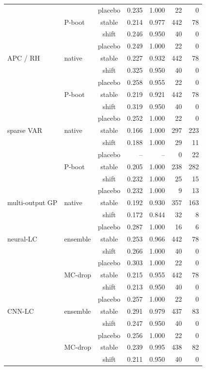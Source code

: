 {\begin{longtable}{@{}llcrrrr@{}}
 &  & placebo & 0.235 & 1.000 & 22 & 0 \\
 & P-boot & stable & 0.214 & 0.977 & 442 & 78 \\
 &  & shift & 0.246 & 0.950 & 40 & 0 \\
 &  & placebo & 0.249 & 1.000 & 22 & 0 \\
\addlinespace[2pt]
APC / RH & native & stable & 0.227 & 0.932 & 442 & 78 \\
 &  & shift & 0.325 & 0.950 & 40 & 0 \\
 &  & placebo & 0.258 & 0.955 & 22 & 0 \\
 & P-boot & stable & 0.219 & 0.921 & 442 & 78 \\
 &  & shift & 0.319 & 0.950 & 40 & 0 \\
 &  & placebo & 0.252 & 1.000 & 22 & 0 \\
\addlinespace[2pt]
sparse VAR & native & stable & 0.166 & 1.000 & 297 & 223 \\
 &  & shift & 0.188 & 1.000 & 29 & 11 \\
 &  & placebo & -- & -- & 0 & 22 \\
 & P-boot & stable & 0.205 & 1.000 & 238 & 282 \\
 &  & shift & 0.232 & 1.000 & 25 & 15 \\
 &  & placebo & 0.232 & 1.000 & 9 & 13 \\
\addlinespace[2pt]
multi-output GP & native & stable & 0.192 & 0.930 & 357 & 163 \\
 &  & shift & 0.172 & 0.844 & 32 & 8 \\
 &  & placebo & 0.287 & 1.000 & 16 & 6 \\
\addlinespace[2pt]
neural-LC & ensemble & stable & 0.253 & 0.966 & 442 & 78 \\
 &  & shift & 0.266 & 1.000 & 40 & 0 \\
 &  & placebo & 0.303 & 1.000 & 22 & 0 \\
 & MC-drop & stable & 0.215 & 0.955 & 442 & 78 \\
 &  & shift & 0.213 & 0.950 & 40 & 0 \\
 &  & placebo & 0.257 & 1.000 & 22 & 0 \\
\addlinespace[2pt]
CNN-LC & ensemble & stable & 0.291 & 0.979 & 437 & 83 \\
 &  & shift & 0.247 & 0.950 & 40 & 0 \\
 &  & placebo & 0.256 & 1.000 & 22 & 0 \\
 & MC-drop & stable & 0.239 & 0.995 & 438 & 82 \\
 &  & shift & 0.211 & 0.950 & 40 & 0 \\

\end{longtable}}
